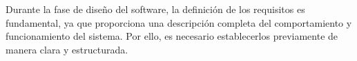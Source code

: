 Durante la fase de diseño del software, la definición de los requisitos es fundamental, 
ya que proporciona una descripción completa del comportamiento y funcionamiento del sistema. 
Por ello, es necesario establecerlos previamente de manera clara y estructurada. 

